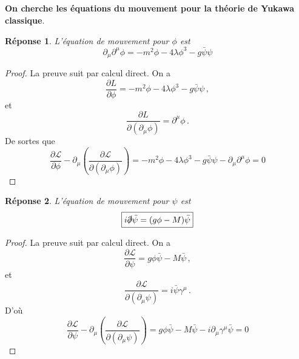 \documentclass{article}
\numberwithin{equation}{section}
\theoremstyle{solution}
\newtheorem{solution}{Réponse}[section]
\begin{document}
\subsection{}
\textbf{On cherche les équations du mouvement pour la théorie de Yukawa classique}.\\
\begin{solution}
       L'équation de mouvement pour $\phi$ est
       \begin{equation}
               \boxed{\partial_\mu\partial^{\mu} \phi = -m^{2} \phi - 4\lambda \phi^{3} - g \bar{ \psi} \psi }
       \end{equation} 
\end{solution}
\begin{proof}
La preuve suit par calcul direct. On a
\begin{equation}
        \frac{\partial L}{\partial \phi} = -m^{2}\phi - 4\lambda \phi^{3} - g \bar{\psi}\psi\, ,
\end{equation} 
et
\begin{equation}
        \frac{\partial L}{\partial (\partial_\mu \phi)} = \partial^{\mu}\phi\, .
\end{equation} 
De sortes que
\begin{equation}
        \frac{\partial \mathcal{L}}{\partial \phi} - \partial_\mu \left( \frac{\partial \mathcal{L}}{\partial (\partial_\mu \phi)} \right)
        = -m^{2}\phi - 4\lambda \phi^{3} -g \bar{\psi} \psi - \partial_\mu \partial^{\mu} \phi
        = 0
\end{equation} 
\end{proof}
\begin{solution}
       L'équation de mouvement pour $\psi$ est
       \begin{equation}
               \boxed{i \slashed{\partial} \bar{\psi} = (g \phi - M) \bar{\psi}}
       \end{equation} 
\end{solution}
\begin{proof}
La preuve suit par calcul direct. On a
\begin{equation}
        \frac{\partial \mathcal{L}}{\partial \psi} = g\phi \bar{\psi} - M \bar{\psi}\, ,
\end{equation} 
et
\begin{equation}
        \frac{\partial \mathcal{L}}{\partial (\partial_\mu \psi)} = i \bar{\psi} \gamma^{\mu}\, .
\end{equation} 
D'où
\begin{equation}
        \frac{\partial \mathcal{L}}{\partial \psi} - \partial_\mu \left( \frac{\partial \mathcal{L}}{\partial (\partial_\mu \psi)} \right)
        =
        g\phi \bar{\psi} - M \bar{\psi}
        -
         i\partial_\mu \gamma^{\mu}\bar{\psi} 
        = 0
\end{equation} 
\end{proof}
\end{document}
